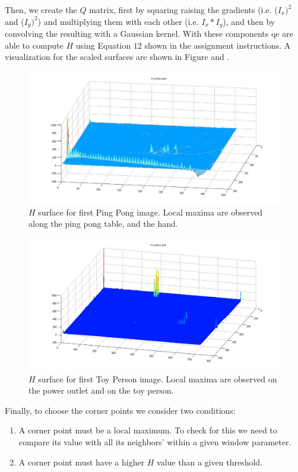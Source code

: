 \documentclass[11pt]{article}
\begin{document}
Then, we create the $Q$ matrix, first by squaring raising the gradients (i.e. ($I_x)^2$ and ($I_y)^2$) and multiplying them with each other (i.e. $I_x * I_y$), and then by convolving the resulting with a Gaussian kernel. With these components qe are able to compute $H$ using Equation $12$ shown in the assignment instructions. A visualization for the scaled surfaces are shown in Figure and  .

\begin{figure}[H] \centering
	\includegraphics[width=1\textwidth]{imgs/surface_pingpong.jpg}
	\caption{$H$ surface for first Ping Pong image. Local maxima are observed along the ping pong table, and the hand.}
	\label{fig:surface_pingpong}
\end{figure}

\begin{figure}[H] \centering
	\includegraphics[width=1\textwidth]{imgs/surface_person.jpg}
	\caption{$H$ surface for first Toy Person image. Local maxima are observed on the power outlet and on the toy person.}
	\label{fig:surface_person}
\end{figure}

Finally, to choose the corner points we consider two conditions: 
\begin{enumerate}
	\item A corner point must be a local maximum. To check for this we need to compare its value with all its neighbors' within a given window parameter.
	\item A corner point must have a higher $H$ value than a given threshold. 
\end{enumerate}
\end{document}
